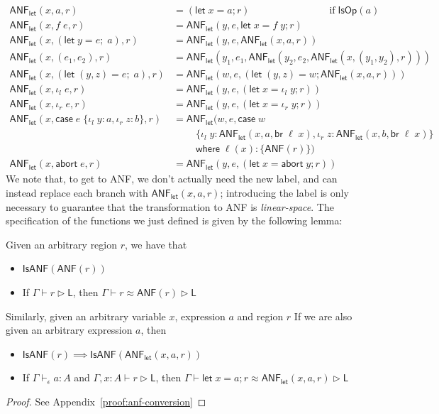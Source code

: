 \documentclass[acmsmall,screen,review]{acmart}
\newcommand{\ms}[1]{\ensuremath{\mathsf{#1}}}
\newcommand{\lto}{:}
\newcommand{\linl}[1]{\iota_l\;{#1}}
\newcommand{\linr}[1]{\iota_r\;{#1}}
\newcommand{\labort}[1]{\ms{abort}\;{#1}}
\newcommand{\letexpr}[3]{\ensuremath{\ms{let}\;#1 = #2;\;#3}}
\newcommand{\caseexpr}[5]{\ms{case}\;#1\;\{\linl{#2} \lto #3, \linr{#4} \lto #5\}}
\newcommand{\letstmt}[3]{\ensuremath{\ms{let}\;#1 = #2; #3}}
\newcommand{\brb}[2]{\ms{br}\;#1\;#2}
\newcommand{\casestmt}[5]{\ms{case}\;#1\;\{\linl{#2} \lto #3, \linr{#4} \lto #5\}}
\newcommand{\where}[2]{#1\;\ms{where}\;#2}
\newcommand{\wbranch}[3]{#1(#2) \lto \{#3\}}
\newcommand{\bhyp}[2]{#1 : #2}
\newcommand{\hasty}[4]{#1 \vdash_{#2} #3: {#4}}
\newcommand{\haslb}[3]{#1 \vdash #2 \rhd #3}
\newcommand{\teqv}{\approx}
\newcommand{\lbeq}[4]{#1 \vdash #2 \teqv #3 \rhd {#4}}
\newcommand{\toanf}[1]{\ms{ANF}(#1)}
\newcommand{\isanf}[1]{\ms{IsANF}(#1)}
\newcommand{\isopex}[1]{\ms{IsOp}(#1)}
\newcommand{\letanf}[3]{\ms{ANF}_{\ms{let}}(#1, #2, #3)}
\begin{document}
\begin{equation}
  \begin{aligned}
    \letanf{x}{a}{r} &= (\letstmt{x}{a}{r}) \hspace{8em} \text{if}\;\isopex{a} \\
    \letanf{x}{f\;e}{r} &= \letanf{y}{e}{\letstmt{x}{f\;y}{r}} \\
    \letanf{x}{(\letexpr{y}{e}{a})}{r} &= \letanf{y}{e}{\letanf{x}{a}{r}} \\
    \letanf{x}{(e_1, e_2)}{r} &= \letanf{y_1}{e_1}{\letanf{y_2}{e_2}{\letanf{x}{(y_1,y_2)}{r}}} \\
    \letanf{x}{(\letexpr{(y, z)}{e}{a})}{r} 
      &= \letanf{w}{e}{(\letstmt{(y, z)}{w}{\letanf{x}{a}{r}})} \\
    \letanf{x}{\linl{e}}{r} &= \letanf{y}{e}{(\letstmt{x}{\linl{y}}{r})} \\
    \letanf{x}{\linr{e}}{r} &= \letanf{y}{e}{(\letstmt{x}{\linr{y}}{r})} \\
    \letanf{x}{\caseexpr{e}{y}{a}{z}{b}}{r} &= 
      \letanf{w}{e}{
        \where{\casestmt{w \\ & \qquad}
          {y}{\letanf{x}{a}{\brb{\ell}{x}}}
          {z}{\letanf{x}{b}{\brb{\ell}{x}}} \\ & \qquad}
        {\wbranch{\ell}{x}{\toanf{r}}}
      } 
    \\
    \letanf{x}{\labort{e}}{r} &= \letanf{y}{e}{(\letstmt{x}{\labort{y}}{r})}
  \end{aligned}
\end{equation}
We note that, to get to ANF, we don't actually need the new label, and can instead replace each
branch with $\letanf{x}{a}{r}$; introducing the label is only necessary to guarantee that the
transformation to ANF is \emph{linear-space}.
%
The specification of the functions we just defined is given by the following lemma:
\begin{lemma}[name=A-normalization, restate=anfconversion]
  Given an arbitrary region $r$, we have that
  \begin{itemize}
    \item $\isanf{\toanf{r}}$
    \item If $\haslb{\Gamma}{r}{\ms{L}}$, then $\lbeq{\Gamma}{r}{\ms{ANF}(r)}{\ms{L}}$
  \end{itemize}
  Similarly, given an arbitrary variable $x$, expression $a$ and region $r$
  If we are also given an arbitrary expression $a$, then
  \begin{itemize}
    \item $\isanf{r} \implies \isanf{\letanf{x}{a}{r}}$
    \item If $\hasty{\Gamma}{\epsilon}{a}{A}$ and $\haslb{\Gamma, \bhyp{x}{A}}{r}{\ms{L}}$, then
      $\lbeq{\Gamma}{\letstmt{x}{a}{r}}{\letanf{x}{a}{r}}{\ms{L}}$
  \end{itemize}
\end{lemma}
\begin{proof}
  See Appendix~\ref{proof:anf-conversion}
\end{proof}
\end{document}
